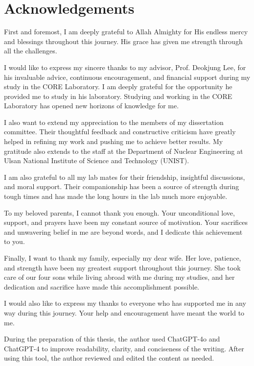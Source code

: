 \section*{\hfill \Large Acknowledgements \hfill}
First and foremost, I am deeply grateful to Allah Almighty for His endless mercy and blessings throughout this journey. His grace has given me strength through all the challenges.

I would like to express my sincere thanks to my advisor, Prof. Deokjung Lee, for his invaluable advice, continuous encouragement, and financial support during my study in the CORE Laboratory. I am deeply grateful for the opportunity he provided me to study in his laboratory. Studying and working in the CORE Laboratory has opened new horizons of knowledge for me.

I also want to extend my appreciation to the members of my dissertation committee. Their thoughtful feedback and constructive criticism have greatly helped in refining my work and pushing me to achieve better results. My gratitude also extends to the staff at the Department of Nuclear Engineering at Ulsan National Institute of Science and Technology (UNIST).

I am also grateful to all my lab mates for their friendship, insightful discussions, and moral support. Their companionship has been a source of strength during tough times and has made the long hours in the lab much more enjoyable. 

To my beloved parents, I cannot thank you enough. Your unconditional love, support, and prayers have been my constant source of motivation. Your sacrifices and unwavering belief in me are beyond words, and I dedicate this achievement to you.

Finally, I want to thank my family, especially my dear wife. Her love, patience, and strength have been my greatest support throughout this journey. She took care of our four sons while living abroad with me during my studies, and her dedication and sacrifice have made this accomplishment possible.

I would also like to express my thanks to everyone who has supported me in any way during this journey. Your help and encouragement have meant the world to me.

During the preparation of this thesis, the author used ChatGPT-4o and ChatGPT-4 to improve readability, clarity, and conciseness of the writing. After using this tool, the author reviewed and edited the content as needed.
\clearpage